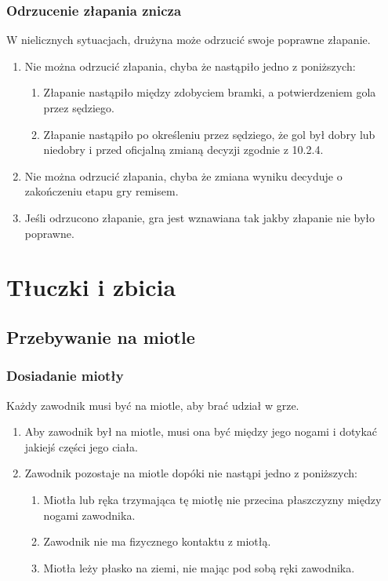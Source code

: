 \documentclass[11pt,a4paper]{article}
\begin{document}
\subsubsection{Odrzucenie złapania znicza}
W nielicznych sytuacjach, drużyna może odrzucić swoje poprawne złapanie.
\begin{enumerate}
  \item Nie można odrzucić złapania, chyba że nastąpiło jedno z poniższych:
  \begin{enumerate}
    \item Złapanie nastąpiło między zdobyciem bramki, a potwierdzeniem gola przez sędziego.
    \item Złapanie nastąpiło po określeniu przez sędziego, że gol był dobry lub niedobry i przed oficjalną zmianą decyzji zgodnie z 10.2.4. %
  \end{enumerate}
  \item Nie można odrzucić złapania, chyba że zmiana wyniku decyduje o zakończeniu etapu gry remisem.
  \item Jeśli odrzucono złapanie, gra jest wznawiana tak jakby złapanie nie było poprawne.
\end{enumerate}

\section{Tłuczki i zbicia}

\subsection{Przebywanie na miotle}

\subsubsection{Dosiadanie miotły}
Każdy zawodnik musi być na miotle, aby brać udział w grze.
\begin{enumerate}
  \item Aby zawodnik był na miotle, musi ona być między jego nogami i dotykać jakiejś części jego ciała.
  \item Zawodnik pozostaje na miotle dopóki nie nastąpi jedno z poniższych:
  \begin{enumerate}
    \item Miotła lub ręka trzymająca tę miotłę nie przecina płaszczyzny między nogami zawodnika.
    \item Zawodnik nie ma fizycznego kontaktu z miotłą.
    \item Miotła leży płasko na ziemi, nie mając pod sobą ręki zawodnika.
  \end{enumerate}
\end{enumerate}
\end{document}
